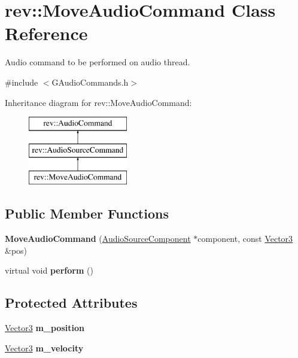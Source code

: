\hypertarget{classrev_1_1_move_audio_command}{}\section{rev\+::Move\+Audio\+Command Class Reference}
\label{classrev_1_1_move_audio_command}


Audio command to be performed on audio thread.  




{\ttfamily \#include $<$G\+Audio\+Commands.\+h$>$}

Inheritance diagram for rev\+::Move\+Audio\+Command\+:\begin{figure}[H]
\begin{center}
\leavevmode
\includegraphics[height=3.000000cm]{classrev_1_1_move_audio_command}
\end{center}
\end{figure}
\subsection*{Public Member Functions}
\begin{DoxyCompactItemize}
\item 
\mbox{\label{classrev_1_1_move_audio_command_acae535a226557476f844c9aa2e944eb7}} 
{\bfseries Move\+Audio\+Command} (\mbox{\hyperlink{classrev_1_1_audio_source_component}{Audio\+Source\+Component}} $\ast$component, const \mbox{\hyperlink{classrev_1_1_vector}{Vector3}} \&pos)
\item 
\mbox{\label{classrev_1_1_move_audio_command_ab0c31f34b41b0326330af1d459dae9bd}} 
virtual void {\bfseries perform} ()
\end{DoxyCompactItemize}
\subsection*{Protected Attributes}
\begin{DoxyCompactItemize}
\item 
\mbox{\label{classrev_1_1_move_audio_command_a3e23aa03b3e3172a197f1af588f7c51c}} 
\mbox{\hyperlink{classrev_1_1_vector}{Vector3}} {\bfseries m\+\_\+position}
\item 
\mbox{\label{classrev_1_1_move_audio_command_a80a879ed259aee40e8f5ed1e02261c02}} 
\mbox{\hyperlink{classrev_1_1_vector}{Vector3}} {\bfseries m\+\_\+velocity}
\end{DoxyCompactItemize}


